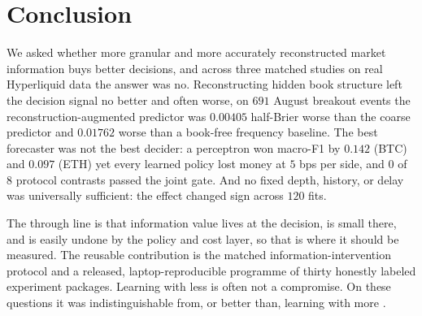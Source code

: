 \section{Conclusion}
\label{sec:conclusion}

We asked whether more granular and more accurately reconstructed market information buys
better decisions, and across three matched studies on real Hyperliquid data the answer was
no. Reconstructing hidden book structure left the decision signal no better and often worse, on $691$ August breakout events the reconstruction-augmented predictor was $0.00405$
half-Brier worse than the coarse predictor and $0.01762$ worse than a book-free frequency
baseline. The best forecaster was not the best decider: a perceptron won macro-F1 by
$0.142$ (BTC) and $0.097$ (ETH) yet every learned policy lost money at $5$ bps per side,
and $0$ of $8$ protocol contrasts passed the joint gate. And no fixed depth, history, or
delay was universally sufficient: the effect changed sign across $120$ fits.

The through line is that information value lives at the decision, is small there, and is
easily undone by the policy and cost layer, so that is where it should be measured. The
reusable contribution is the matched information-intervention protocol and a released,
laptop-reproducible programme of thirty honestly labeled experiment packages. Learning with less
is often not a compromise. On these questions it was indistinguishable from, or better
than, learning with more \citep{ye2026learning, falezza2026when}.
